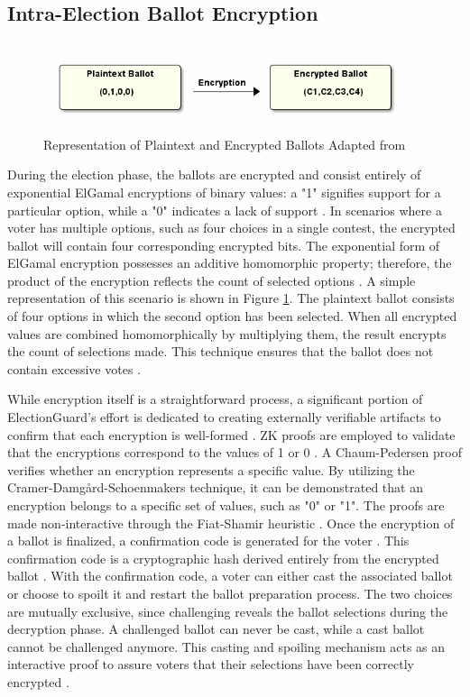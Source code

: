 \subsection{Intra-Election Ballot Encryption}
\begin{figure}[ht!]
    \centering
    \includegraphics[scale=.5]{abbildungen/Diagramme/ballotencryption.png}
    \caption{Representation of Plaintext and Encrypted Ballots Adapted from \cite{eg-docs}} \label{Fig:ballot-representation}
\end{figure}
During the election phase, the ballots are encrypted and consist entirely of exponential ElGamal encryptions of binary values: a "1" signifies support for a particular option, while a "0" indicates a lack of support \cite[11]{eg-paper} \cite[12]{eg-spec}. In scenarios where a voter has multiple options, such as four choices in a single contest, the encrypted ballot will contain four corresponding encrypted bits. The exponential form of ElGamal encryption possesses an additive homomorphic property; therefore, the product of the encryption reflects the count of selected options \cite[5]{eg-spec}. A simple representation of this scenario is shown in Figure \ref{Fig:ballot-representation}. The plaintext ballot consists of four options in which the second option has been selected. When all encrypted values are combined homomorphically by multiplying them, the result encrypts the count of selections made. This technique ensures that the ballot does not contain excessive votes \cite[5]{eg-spec}.

While encryption itself is a straightforward process, a significant portion of ElectionGuard's effort is dedicated to creating externally verifiable artifacts to confirm that each encryption is well-formed \cite[3]{eg-spec}. \ac{ZK} proofs are employed to validate that the encryptions correspond to the values of 1 or 0 \cite[11]{eg-paper}. A Chaum-Pedersen proof verifies whether an encryption represents a specific value. By utilizing the Cramer-Damgård-Schoenmakers technique, it can be demonstrated that an encryption belongs to a specific set of values, such as "0" or "1". The proofs are made non-interactive through the Fiat-Shamir heuristic \cite[6,13]{eg-spec}. Once the encryption of a ballot is finalized, a confirmation code is generated for the voter \cite[17]{eg-spec}. This confirmation code is a cryptographic hash derived entirely from the encrypted ballot \cite[14]{eg-paper}. With the confirmation code, a voter can either cast the associated ballot or choose to spoilt it and restart the ballot preparation process. The two choices are mutually exclusive, since challenging reveals the ballot selections during the decryption phase. A challenged ballot can never be cast, while a cast ballot cannot be challenged anymore. This casting and spoiling mechanism acts as an interactive proof to assure voters that their selections have been correctly encrypted \cite[17]{eg-spec} \cite{eg-docs}.

